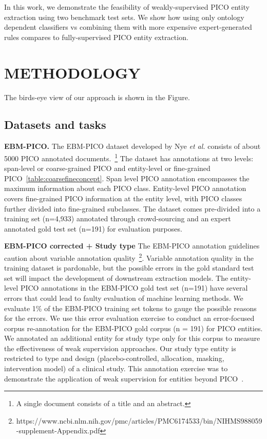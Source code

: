 \documentclass[10.7pt,]{article}
\begin{document}
In this work, we demonstrate the feasibility of weakly-supervised PICO entity extraction using two benchmark test sets.
We show how using only ontology dependent classifiers vs combining them with more expensive expert-generated rules compares to fully-supervised PICO entity extraction.
%
%
%
\section{METHODOLOGY}\label{methods}
%
The birds-eye view of our approach is shown in the Figure.
%
%
%
\subsection{Datasets and tasks}\label{data}
%
\textbf{EBM-PICO.}
The EBM-PICO dataset developed by Nye \textit{et al.} consists of about 5000 PICO annotated documents.~\footnote{A single document consists of a title and an abstract.}
The dataset has annotations at two levels: span-level or coarse-grained PICO and entity-level or fine-grained PICO~\ref{table:coarsefineconcept}.
Span level PICO annotation encompasses the maximum information about each PICO class.
Entity-level PICO annotation covers fine-grained PICO information at the entity level, with PICO classes further divided into fine-grained subclasses.
The dataset comes pre-divided into a training set (n=4,933) annotated through crowd-sourcing and an expert annotated gold test set (n=191) for evaluation purposes.




\textbf{EBM-PICO corrected + Study type}
The EBM-PICO annotation guidelines caution about variable annotation quality~\footnote{https://www.ncbi.nlm.nih.gov/pmc/articles/PMC6174533/bin/NIHMS988059-supplement-Appendix.pdf}.
Variable annotation quality in the training dataset is pardonable, but the possible errors in the gold standard test set will impact the development of downstream extraction models.
The entity-level PICO annotations in the EBM-PICO gold test set (n=191) have several errors that could lead to faulty evaluation of machine learning methods.
We evaluate 1\% of the EBM-PICO training set tokens to gauge the possible reasons for the errors.
We use this error evaluation exercise to conduct an error-focused corpus re-annotation for the EBM-PICO gold corpus (n = 191) for PICO entities.
We annotated an additional entity for study type only for this corpus to measure the effectiveness of weak supervision approaches.
Our study type entity is restricted to type and design (placebo-controlled, allocation, masking, intervention model) of a clinical study.
This annotation exercise was to demonstrate the application of weak supervision for entities beyond PICO~\cite{menard2019turning}.
\end{document}
